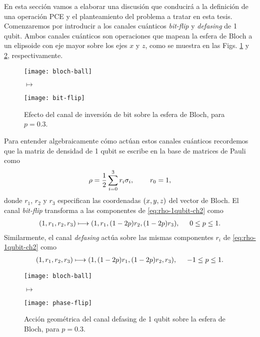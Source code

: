 En esta sección vamos a elaborar una discusión que conducirá a
la definición de una operación PCE y el planteamiento del problema
a tratar en esta tesis. 
Comenzaremos por introducir a los canales cuánticos  
\textit{bit-flip} y \textit{defasing} de 1 qubit. 
Ambos canales cuánticos son operaciones que mapean 
la esfera de Bloch a un elipsoide con eje mayor sobre los ejes $x$ y $z$, 
como se muestra en las Figs. \ref{fig:bit-flip} y \ref{fig:phase-flip}, 
respectivamente.
\begin{figure}
\centering
\begin{minipage}{.4\textwidth}
    \centering
    \texttt{[image: bloch-ball]}
\end{minipage}
\LARGE{$\longmapsto$}
\begin{minipage}{0.4\textwidth}
    \centering
    \texttt{[image: bit-flip]}
\end{minipage}
\caption{
Efecto del canal de inversión de bit sobre la esfera de Bloch, para $p=0.3$.}
\label{fig:bit-flip}
\end{figure}
Para entender algebraicamente cómo actúan estos canales cuánticos 
recordemos que la matriz de densidad de 1 qubit se escribe en la 
base de matrices de Pauli como
\begin{align}\label{eq:rho-1qubit-ch2}
\rho=\frac{1}{2}\sum_{i=0}^3r_i\sigma_i,\hspace{.8cm}r_0=1,
\end{align}
donde $r_1$, $r_2$ y $r_3$ especifican las coordenadas $\qty(x,y,z)$ 
del vector de Bloch. El canal \textit{bit-flip} transforma a las componentes 
de \eqref{eq:rho-1qubit-ch2} como~\cite{nielsen_chuang_2011}
\begin{align}\label{eq:bit-flip-transformation}
\qty(1,r_1,r_2,r_3)\longmapsto \qty(1,r_1,(1-2p)r_2,(1-2p)r_3),
\hspace{.5cm} 0\leq p\leq 1.
\end{align}
Similarmente, el canal \textit{defasing} actúa sobre las mismas
componentes $r_i$ de \eqref{eq:rho-1qubit-ch2}
como~\cite{nielsen_chuang_2011}
\begin{align}\label{eq:defasing-transformation}
\qty(1,r_1,r_2,r_3)\longmapsto \qty(1,(1-2p)r_1,(1-2p)r_2,r_3),
\hspace{.5cm} -1\leq p\leq 1.
\end{align}
\begin{figure}
\centering
\begin{minipage}{.4\textwidth}
    \centering
    \texttt{[image: bloch-ball]}
\end{minipage}
\LARGE{$\longmapsto$}
\begin{minipage}{0.4\textwidth}
    \centering
    \texttt{[image: phase-flip]}
\end{minipage}
\caption{
Acción geométrica del canal defasing de 1 qubit sobre la 
esfera de Bloch, para $p=0.3$.}
\label{fig:phase-flip}
\end{figure}
